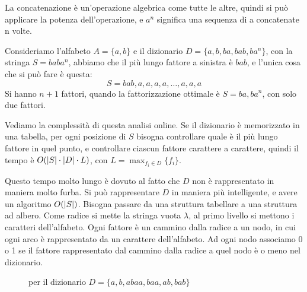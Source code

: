 La concatenazione \`e un'operazione algebrica come tutte le altre, quindi si pu\`o applicare la potenza dell'operazione, e $a^n$ significa una sequenza di a concatenate n volte.

Consideriamo l'alfabeto $A = \{ a, b \}$ e il dizionario $D = \{ a, b, ba, bab, ba^n \}$, con la stringa $S = baba^{n}$, abbiamo che il pi\`u lungo fattore a sinistra \`e $bab$, e l'unica cosa che si pu\`o fare \`e questa:
\[
S = bab,a,a,a,a,\ldots,a,a,a
\]
Si hanno $n+1$ fattori, quando la fattorizzazione ottimale \`e $S = ba, ba^n$, con solo due fattori.

Vediamo la complessit\`a di questa analisi online. Se il dizionario \`e memorizzato in una tabella, per ogni posizione di $S$ bisogna controllare quale \`e il pi\`u lungo fattore in quel punto, e controllare ciascun fattore carattere a carattere, quindi il tempo \`e $O(\left\lvert{S}\right\rvert \cdot \left\lvert{D}\right\rvert \cdot L)$, con $L = \max_{f_i \in D} \{ f_i \}$.

Questo tempo molto lungo \`e dovuto al fatto che $D$ non \`e rappresentato in maniera molto furba. Si pu\`o rappresentare $D$ in maniera pi\`u intelligente, e avere un algoritmo $O(\left\lvert{S}\right\rvert)$. Bisogna passare da una struttura tabellare a una struttura ad albero. Come radice si mette la stringa vuota $\lambda$, al primo livello si mettono i caratteri dell'alfabeto. Ogni fattore \`e un cammino dalla radice a un nodo, in cui ogni arco \`e rappresentato da un carattere dell'alfabeto. Ad ogni nodo associamo 0 o 1 se il fattore rappresentato dal cammino dalla radice a quel nodo \`e o meno nel dizionario.

\begin{figure}
\centering
{}
\caption{ per il dizionario $D = \{ a, b, abaa, baa, ab, bab \}$}
\end{figure}

